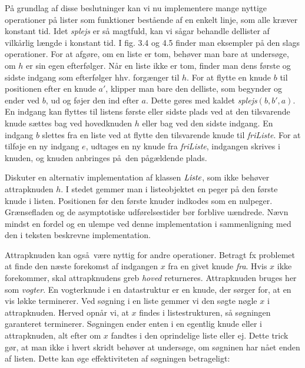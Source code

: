 På grundlag af disse beslutninger kan vi nu implementere mange nyttige operationer på lister som funktioner bestående af en enkelt linje, som alle kræver konstant tid.
Idet \emph{splejs} er så magtfuld, kan vi sågar behandle dellister af vilkårlig længde i konstant tid.
I fig. 3.4 og 4.5 finder man eksempler på den slags operationer.
For at afgøre, om en liste er tom, behøver man bare at undersøge, om $h$ er sin egen efterfølger.
Når en liste ikke er tom, finder man dens første og sidste indgang som efterfølger hhv. forgænger til $h$.
For at flytte en knude $b$ til positionen efter en knude $a'$, klipper man bare den delliste, som begynder og ender ved $b$, ud og føjer den ind efter $a$.
Dette gøres med kaldet \emph{splejs}$(b,b', a)$.
En indgang kan flyttes til listens første eller sidste plads ved at den tilsvarende knude sættes bag ved hovedknuden $h$ eller bag ved den sidste indgang.
En indgang $b$ slettes fra en liste ved at flytte den tilsvarende knude til \emph{friListe}.
For at tilføje en ny indgang $e$, udtages en ny knude fra \emph{friListe}, indgangen skrives i knuden, og knuden anbringes på den pågældende plads.

\begin{exerc}
  Diskuter en alternativ implementation af klassen $\operatorname{\emph{Liste}}$, som ikke behøver attrapknuden $h$.
  I stedet gemmer man i listeobjektet en peger på den første knude i listen.
  Positionen før den første knuder indkodes som en nulpeger.
  Grænsefladen og de asymptotiske udførelsestider bør forblive uændrede.
  Nævn mindst en fordel og en ulempe ved denne implementation i sammenligning med den i teksten beskrevne implementation.
\end{exerc}

Attrapknuden kan også være nyttig for andre operationer. 
Betragt fx problemet at finde den næste forekomst af indgangen $x$ fra en givet knude \emph{fra}.
  Hvis $x$ ikke forekommer, skal attrapknudens greb \emph{hoved} returneres.
  Attrapknuden bruges her som \emph{vogter}.
  En vogterknude i en datastruktur er en knude, der sørger for, at en vis løkke terminerer.
  Ved søgning i en liste gemmer vi den søgte nøgle $x$ i attrapknuden.
  Herved opnår vi, at $x$ findes i listestrukturen, så søgningen garanteret terminerer.
  Søgningen ender enten i en egentlig knude eller i attrapknuden, alt efter om $x$ fandtes i den oprindelige liste eller ej.
  Dette trick gør, at man ikke i hvert skridt behøver at undersøge, om søgninen har nået enden af listen.
  Dette kan øge effektiviteten af søgningen betrageligt:

